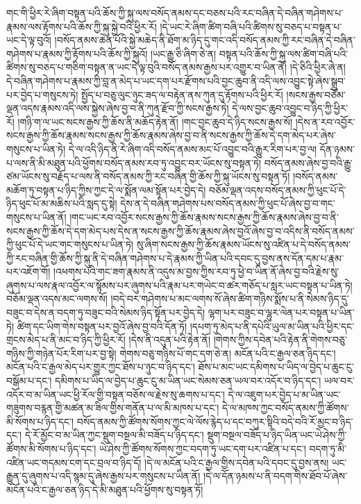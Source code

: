གང་གི་ཕྱིར་རེ་ཞིག་བསྟན་པའི་ཆོས་ཀྱི་སྐུ་ལས་བསོད་ནམས་དང་བཅས་པའི་རང་བཞིན་དེ་བཞིན་གཤེགས་པ་རྣམས་ལས་རྟོགས་པའི་ཆོས་ཀྱི་སྐུ་སྐྱེ་བའི་ཕྱིར་རོ། །དེ་ཡང་རེ་ཞིག་ཚིག་བཞི་པའི་ཚིགས་སུ་བཅད་པ་བསྟན་པ་ཡང་དེ་ལྟ་བུའོ། །བསོད་ནམས་ཆེན་པོའི་སྐྱེ་མཆེད་ནི་ཐོག་མ་ཉིད་དུ་གང་འདི་བསོད་ནམས་ཀྱི་རང་བཞིན་དེ་བཞིན་གཤེགས་པ་རྣམས་ཀྱི་རྟོགས་པའི་ཆོས་ཀྱི་སྐུའོ། །ཡང་རྒྱུ་ཅི་ཞིག་ཅེ་ན། བསྟན་པའི་ཆོས་ཀྱི་སྐུ་ལས་ཚིག་བཞི་པའི་ཚིགས་སུ་བཅད་པ་གཅིག་བསྟན་ན་ཡང་དེ་ལྟ་བུའི་བསོད་ནམས་རྒྱས་པར་འགྱུར་བ་ཡིན་ནོ། །དེ་ཅིའི་ཕྱིར་ཞེ་ན། དེ་བཞིན་གཤེགས་པ་རྣམས་ཀྱི་བླ་ན་མེད་པ་ཡང་དག་པར་རྫོགས་པའི་བྱང་ཆུབ་ནི་འདི་ལས་འབྱུང་སྟེ་ཞེས་སྒྲུབ་པར་བྱེད་པ་གསུངས་ཏེ། སྤྱོད་པ་བཅུ་ལུང་ཉུང་ཟད་ལ་བརྟེན་ནས་ཀུན་དུ་རྟོགས་པའི་ཕྱིར་རོ། །སངས་རྒྱས་བཅོམ་ལྡན་འདས་རྣམས་འདི་ལས་སྐྱེས་ཞེས་བྱ་བ་ནི་ཀུན་རྫོབ་ཀྱི་སངས་རྒྱས་ཏེ། དེ་ལས་བྱང་ཆུབ་འབྱུང་བ་ཉིད་ཀྱི་ཕྱིར་རོ། །གཉི་ག་ལ་ཡང་སངས་རྒྱས་ཀྱི་ཆོས་ནི་མཆོད་རྟེན་ནོ། །གང་བྱང་ཆུབ་དེ་ཉིད་སངས་རྒྱས་སོ། །དེས་ན་རབ་འབྱོར་སངས་རྒྱས་ཀྱི་ཆོས་རྣམས་སངས་རྒྱས་ཀྱི་ཆོས་རྣམས་ཞེས་བྱ་བ་ནི་སངས་རྒྱས་ཀྱི་ཆོས་དེ་དག་མེད་པར་ཞེས་གསུངས་པ་ཡིན་ཏེ། དེ་ལ་འདི་ཉིད་ནི་རེ་ཞིག་འདི་བསོད་ནམས་མང་པོ་འབྱུང་བའི་རྒྱུར་རིག་པར་བྱ་ལ། དོན་ཉམས་པ་ལས་ནི་མི་མཐུན་པའི་ཕྱོགས་བསོད་ནམས་རབ་ཏུ་འབྱུང་བར་ཡོངས་སུ་བསྟན་ཏེ། བསོད་ནམས་ཞེས་བྱ་བའི་རྒྱུ་ཙམ་ཡོངས་སུ་བརྗོད་པ་ལས་ནི་བསོད་ནམས་ཀྱི་རང་བཞིན་གྱི་ཆོས་ཀྱི་སྐུ་ཡོངས་སུ་བསྟན་ཏོ། །བསོད་ནམས་མཆོག་ཏུ་བསྟན་པ་ཉིད་ཀྱིས་ཀྱང་དེ་ལ་སྨོན་ལམ་སྟོན་པར་བྱེད་དེ། བཅོམ་ལྡན་འདས་བསོད་ནམས་ཀྱི་ཕུང་པོ་དེ་ཉིད་ཕུང་པོ་མ་མཆིས་པའི་སླད་དུ་སྟེ། དེས་ན་དེ་བཞིན་གཤེགས་པས་བསོད་ནམས་ཀྱི་ཕུང་པོ་ཞེས་བྱ་བ་གང་གསུངས་པ་ཡིན་ནོ། །གང་ཡང་རབ་འབྱོར་སངས་རྒྱས་ཀྱི་ཆོས་རྣམས་སངས་རྒྱས་ཀྱི་ཆོས་རྣམས་ཞེས་བྱ་བ་ནི་སངས་རྒྱས་ཀྱི་ཆོས་དེ་དག་མེད་པས་དེས་ན་སངས་རྒྱས་ཀྱི་ཆོས་རྣམས་ཞེས་བྱའོ་ཞེས་བྱ་བ་འདིས་ནི་བསོད་ནམས་ཀྱི་ཕུང་པོ་དེ་ཡང་གང་གསུངས་པ་ཡིན་ཏེ། སུ་ཞིག་སངས་རྒྱས་ཀྱི་ཆོས་རྣམས་ཡོངས་སུ་འཛིན་པ་དེ་བསོད་ནམས་ཀྱི་རང་བཞིན་གྱི་ཆོས་ཀྱི་སྐུ་ནི་དེ་བཞིན་གཤེགས་པ་དེ་རྣམས་ཀྱི་ཡིན་པའི་དབང་དུ་བྱས་ནས་དོན་དམ་པ་རྣམ་པར་འཇོག་གོ། །འཕགས་པའི་གང་ཟག་རྣམས་ནི་འདུས་མ་བྱས་ཀྱིས་རབ་ཏུ་ཕྱེ་བ་ཡིན་ནོ་ཞེས་བྱ་བའི་རྗེས་སུ་ཞུགས་པ་ལས་རྣལ་འབྱོར་ལ་སྙོམས་པར་ཞུགས་པའི་རྣམ་པར་གཡེང་བ་ཚར་གཅོད་པ་སླར་ཡང་བསྟན་པ་ཡིན་ཏེ། བཅོམ་ལྡན་འདས་མང་ལགས་སོ། །བདེ་བར་གཤེགས་པ་མང་ལགས་སོ་ཞེས་ཚིག་གཉིས་སྨོས་པ་ནི་སེམས་ཉིད་དུ་བཟུང་བ་དེས་ན་བདག་ཏུ་བཟུང་བའི་སེམས་ཉིད་སྟོན་པར་བྱེད་དེ། ལྷག་པར་བཟུང་བ་ལྷུར་ལེན་པར་བསྟན་པ་ཡིན་ཏེ། ཚིག་དང་ཡིག་གེས་བསྟན་པར་བྱའོ་ཞེས་བྱ་བའི་དོན་ཏོ། །དཔག་ཏུ་མེད་པ་ནི་དཔེའི་ཡུལ་མ་ཡིན་པའི་ཕྱིར་དང་གྲངས་མེད་པ་ནི་མང་བ་ཉིད་ཀྱི་ཕྱིར་རོ། །དེས་ནི་འདུན་པའི་རྟེན་ནོ། །གེགས་ཀྱིས་དབེན་པའི་རྟེན་ནི་གེགས་བཅུ་གཉིས་ཀྱི་གཉེན་པོར་རིག་པར་བྱ་སྟེ། གེགས་བཅུ་གཉིས་པོ་གང་དག་ཅེ་ན། མངོན་པའི་ང་རྒྱལ་ཅན་ཉིད་དང་། མངོན་པའི་ང་རྒྱལ་མེད་པར་གྱུར་ཀྱང་ཐོས་པ་ཉུང་བ་ཉིད་དང་། ཐོས་པ་མང་ཡང་དམིགས་པ་ཡིད་ལ་བྱེད་པ་ཆུང་ངུ་བསྒོམ་པ་དང་། དམིགས་པ་ཡིད་ལ་བྱེད་པ་ཆུང་ངུ་མ་ཡིན་ཡང་སེམས་ཅན་ཡལ་བར་འདོར་བ་ཉིད་དང་། ཡལ་བར་འདོར་བ་མ་ཡིན་ཡང་ཕྱི་རོལ་གྱི་བསྟན་བཅོས་ལ་རྗེས་སུ་ཆགས་པ་དང་། དེ་ལ་འཇུག་པར་བྱེད་པ་མ་ཡིན་ཡང་གཟུགས་བརྙན་གྱི་མཚན་མ་ཟིལ་གྱིས་གནོན་པ་ལ་མི་མཁས་པ་དང་། དེ་ལ་མཁས་ཀྱང་བསོད་ནམས་ཀྱི་ཚོགས་མི་སོགས་པ་ཉིད་དང་། བསོད་ནམས་ཀྱི་ཚོགས་སོགས་ཀྱང་ལེ་ལོས་རྙེད་པ་དང་བཀུར་སྟིའི་བདེ་བའི་རོ་མྱང་བ་ཉིད་དང་། དེ་རོ་མྱོང་བ་མ་ཡིན་ཀྱང་སྡུག་བསྔལ་མི་བཟོད་པ་ཉིད་དང་། སྡུག་བསྔལ་བཟོད་པ་ཉིད་ཡིན་ཡང་ཡེ་ཤེས་ཀྱི་ཚོགས་མི་སོགས་པ་ཉིད་དང་། ཡེ་ཤེས་ཀྱི་ཚོགས་སོགས་ཀྱང་བདག་ཏུ་ཡང་དག་པར་འཛིན་པ་དང་། བདག་ཏུ་མི་འཛིན་ཡང་གདམས་ངག་དང་བྲལ་བ་ཉིད་དོ། །དེ་ལ་མངོན་པའི་ང་རྒྱལ་གྱིས་དབེན་པའི་དབང་དུ་བྱས་ནས། ཡང་རྒྱུན་དུ་ཞུགས་པ་འདི་སྙམ་དུ་ཞེས་རྒྱས་པར་གསུངས་པ་ཡིན་ནོ། །དེ་ལ་དོན་ཉམས་པ་ནི་བདག་གིས་ཐོབ་པོ་ཞེས་མངོན་པའི་ང་རྒྱལ་ཅན་ཉིད་དེ་མི་མཐུན་པའི་ཕྱོགས་སུ་བསྟན་ཏོ། 